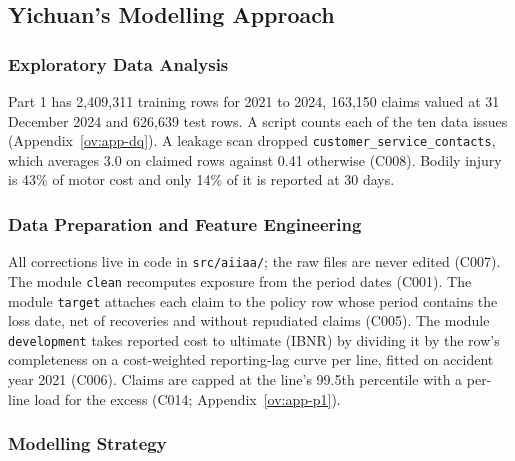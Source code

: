 

\subsection{Yichuan's Modelling Approach}

\subsubsection{Exploratory Data Analysis}

Part 1 has 2,409,311 training rows for 2021 to 2024, 163,150 claims valued at 31 December 2024 and 626,639 test rows.
A script counts each of the ten data issues (Appendix~\ref{ov:app-dq}). A leakage scan dropped
\texttt{customer\_service\_contacts}, which averages 3.0 on claimed rows against 0.41 otherwise (C008). Bodily injury is 43\% of motor cost and only 14\% of it is reported at 30 days.

\subsubsection{Data Preparation and Feature Engineering}

All corrections live in code in \texttt{src/aiiaa/}; the raw files are never edited (C007). The module \texttt{clean}
recomputes exposure from the period dates (C001). The module \texttt{target} attaches each claim to the policy row whose
period contains the loss date, net of recoveries and without repudiated claims (C005). The module \texttt{development}
takes reported cost to ultimate (IBNR) by dividing it by the row's completeness on a cost-weighted reporting-lag curve
per line, fitted on accident year 2021 (C006). Claims are capped at the line's 99.5th percentile with a per-line load
for the excess (C014; Appendix~\ref{ov:app-p1}).

\subsubsection{Modelling Strategy}

